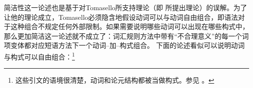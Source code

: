     简洁性这一论述也是基于对Tomasello所支持理论（即 \citet{Goldberg95a, Goldberg2006a}所提出理论）的误解。为了让他的理论成立，Tomasello必须隐含地假设动词可以与动词自由组合，即语法对于这种组合不规定任何外部限制。如果需要说明哪些动词可以出现在哪些构式中，那么更加简洁这一论述就不成立了：词汇规则方法中带有“不合理意义”的每一个词项变体都对应短语方法下一个动词--加--构式组合。
    下面的论述看似可以说明动词与构式可以自由组合：\footnote{这些引文的语境很清楚，动词和论元结构都被当做构式。参见 \citet[，例（2）]{Goldberg2006a}。} 


